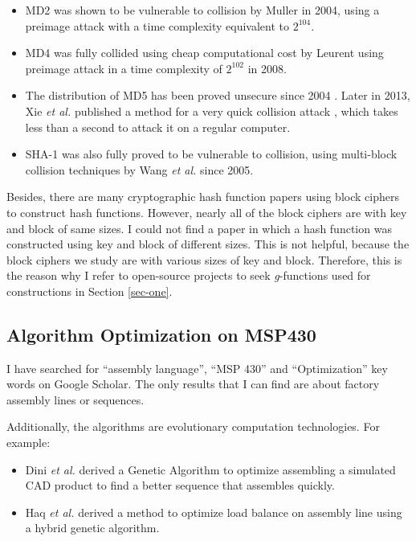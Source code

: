 \documentclass[sigconf, review=false]{acmart}
\let\OldTexttrademark\texttrademark
\renewcommand{\texttrademark}{\OldTexttrademark\xspace}%
\begin{document}
\begin{itemize}
    \item MD2 was shown to be vulnerable to collision by Muller in 2004,
          using a preimage attack with a time complexity equivalent to $2^{104}$. \cite{muller2004md2}
    \item MD4 was fully collided using cheap computational cost by Leurent
          using preimage attack in a time complexity of $2^{102}$ in 2008. \cite{leurent2008md4}
    \item The distribution of MD5 has been proved unsecure since 2004 \cite{hawkes2004musings}.
          Later in 2013, Xie \textit{et al.} published a method for a very quick collision attack \cite{xie2013fast},
          which takes less than a second to attack it on a regular computer.
    \item SHA-1 was also fully proved to be vulnerable to collision, using multi-block collision techniques
          by Wang \textit{et al.} since 2005. \cite{wang2005finding}
\end{itemize}

Besides, there are many cryptographic hash function papers using block ciphers to construct hash functions.
However, nearly all of the block ciphers are with key and block of same sizes.
I could not find a paper in which a hash function was constructed using key and block of different sizes.
This is not helpful, because the block ciphers we study are with various sizes of key and block.
Therefore, this is the reason why I refer to open-source projects to seek \textit{g}-functions used for constructions
in Section \ref{sec-one}.

\subsection{Algorithm Optimization on MSP430} \label{sec-alg-opt}
I have searched for ``assembly language'', ``MSP 430'' and ``Optimization'' key words on Google\texttrademark Scholar.
The only results that I can find are about factory assembly lines or sequences.

Additionally, the algorithms are evolutionary computation technologies. For example:

\begin{itemize}
    \item Dini \textit{et al.} derived a Genetic Algorithm to optimize assembling a simulated CAD product
          to find a better sequence that assembles quickly. \cite{dini1999generation}
    \item Haq \textit{et al.} derived a method to optimize load balance on assembly line
          using a hybrid genetic algorithm. \cite{haq2006hybrid}
\end{itemize}
\end{document}
